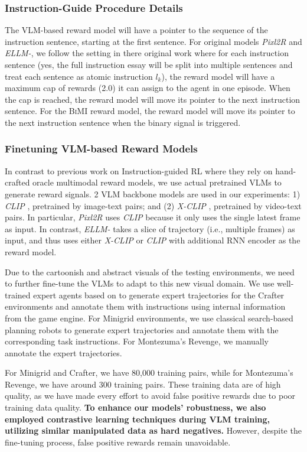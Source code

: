 \documentclass{article}
\theoremstyle{plain}
\theoremstyle{definition}
\theoremstyle{remark}
\begin{document}
\subsubsection{Instruction-Guide Procedure Details}
The VLM-based reward model will have a pointer to the sequence of the instruction sentence, starting at the first sentence. For original models \emph{Pixl2R} and \emph{ELLM-}, we follow the setting in there original work where for each instruction sentence (yes, the full instruction essay will be split into multiple sentences and treat each sentence as atomic instruction $l_k$), the reward model will have a maximum cap of rewards (2.0) it can assign to the agent in one episode. When the cap is reached, the reward model will move its pointer to the next instruction sentence. For the \textsc{BiMI} reward model, the reward model will move its pointer to the next instruction sentence when the binary signal is triggered. 

\subsubsection{Finetuning VLM-based Reward Models}
In contrast to previous work on Instruction-guided RL where they rely on hand-crafted oracle multimodal reward models, we use actual pretrained VLMs to generate reward signals. 2 VLM backbone models are used in our experiments: 1) \emph{CLIP} \citep{Radford2021LearningTV}, pretrained by image-text pairs; and (2) \emph{X-CLIP} \citep{Ma2022XCLIPEM}, pretrained by video-text pairs. In particular, \emph{Pixl2R} uses \emph{CLIP} because it only uses the single latest frame as input. In contrast, \emph{ELLM-} takes a slice of trajectory (i.e., multiple frames) as input, and thus uses either \emph{X-CLIP} or \emph{CLIP} with additional RNN encoder as the reward model.

Due to the cartoonish and abstract visuals of the testing environments, we need to further fine-tune the VLMs to adapt to this new visual domain. We use well-trained expert agents based on \citet{moon2023ad} to generate expert trajectories for the Crafter environments and annotate them with instructions using internal information from the game engine. For Minigrid environments, we use classical search-based planning robots to generate expert trajectories and annotate them with the corresponding task instructions. For Montezuma's Revenge, we manually annotate the expert trajectories.

For Minigrid and Crafter, we have 80,000 training pairs, while for Montezuma's Revenge, we have around 300 training pairs. These training data are of high quality, as we have made every effort to avoid false positive rewards due to poor training data quality. \textbf{To enhance our models' robustness, we also employed contrastive learning techniques during VLM training, utilizing similar manipulated data as hard negatives.} However, despite the fine-tuning process, false positive rewards remain unavoidable.
\end{document}
